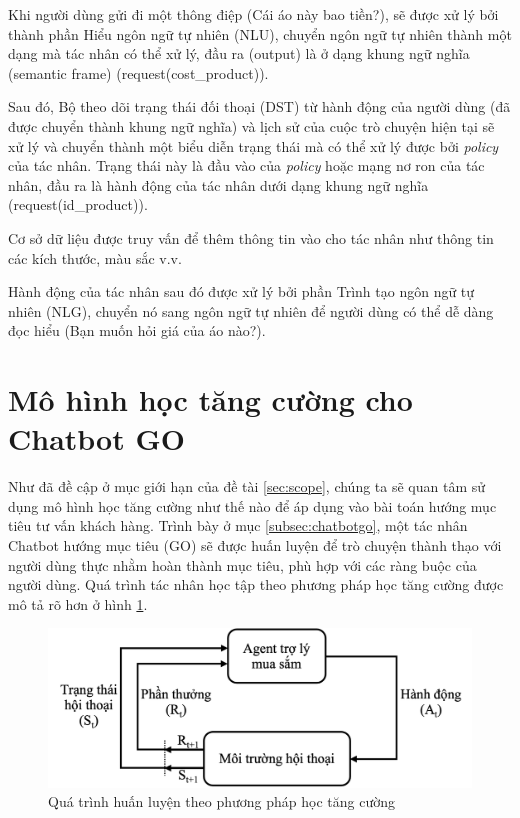 Khi người dùng gửi đi một thông điệp (Cái áo này bao tiền?), sẽ được
xử lý bởi thành phần Hiểu ngôn ngữ tự nhiên (NLU), chuyển ngôn ngữ
tự nhiên thành một dạng mà tác nhân có thể xử lý, đầu ra (output) là
ở dạng khung ngữ nghĩa (semantic frame) (request(cost\_product)).

Sau đó, Bộ theo dõi trạng thái đối thoại (DST) từ hành động của
người dùng (đã được chuyển thành khung ngữ nghĩa) và lịch sử của
cuộc trò chuyện hiện tại sẽ xử lý và chuyển thành một biểu diễn
trạng thái mà có thể xử lý được bởi \textit{policy} của tác nhân.
Trạng thái này là đầu vào của \textit{policy} hoặc mạng nơ ron của
tác nhân, đầu ra là hành động của tác nhân dưới dạng khung ngữ nghĩa
(request(id\_product)).

Cơ sở dữ liệu được truy vấn để thêm thông tin vào cho tác nhân như
thông tin các kích thước, màu sắc v.v.

Hành động của tác nhân sau đó được xử lý bởi phần Trình tạo ngôn ngữ
tự nhiên (NLG), chuyển nó sang ngôn ngữ tự nhiên để người dùng có thể
dễ dàng đọc hiểu (Bạn muốn hỏi giá của áo nào?).

\section{Mô hình học tăng cường cho Chatbot GO}
\label{sec:model}
Như đã đề cập ở mục giới hạn của đề tài \ref{sec:scope}, chúng ta sẽ
quan tâm sử dụng mô hình học tăng cường như thế nào để áp dụng vào
bài toán hướng mục tiêu tư vấn khách hàng. Trình bày ở mục
\ref{subsec:chatbotgo}, một tác nhân Chatbot hướng mục tiêu (GO) sẽ
được huấn luyện để trò chuyện thành thạo với người dùng thực nhằm
hoàn thành mục tiêu, phù hợp với các ràng buộc của người dùng.
Quá trình tác nhân học tập theo phương pháp học tăng cường được mô tả
rõ hơn ở hình \ref{fig:learningflow}.

\begin{figure}[ht]
    \centering
    \includegraphics[scale=1]{thesis/chatbot/kienthuc/img/learningflow.png}
    \caption{Quá trình huấn luyện theo phương pháp học tăng cường}
    \label{fig:learningflow}
\end{figure}

